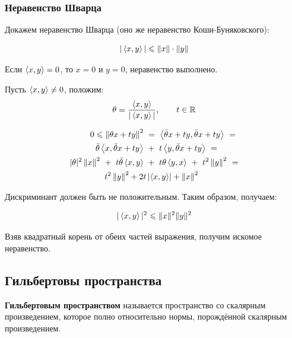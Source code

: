 \documentclass[12pt]{article}
\begin{document}


		\subsubsection{Неравенство Шварца}

			Докажем неравенство Шварца (оно же неравенство Коши-Буняковского):

			$$|\left\langle x, y \right\rangle| \leqslant \left\| x \right\| \cdot \left\| y \right\|$$


			Если $\left\langle x, y \right\rangle = 0$, то $x=0$ и $y=0$, неравенство выполнено.

			Пусть $\left\langle x, y \right\rangle \neq 0$, положим:
			$$\theta = \frac{\left\langle x, y \right\rangle}{|\left\langle x, y \right\rangle|},\qquad t \in \mathbb{R}$$

			\begin{align*}
				0 \leqslant \left\| 
				{\theta} x + t y \right\|^2 ~&=~ \left\langle \bar{\theta} x + t y, \bar{\theta} x + t y \right\rangle ~= \\
				\bar{\theta} \left\langle x, \bar{\theta} x + t y \right\rangle ~&+~ t \left\langle y, \bar{\theta} x + t y \right\rangle ~= \\
				|\theta|^2 \left\| x \right\|^2 ~+~ t \bar{\theta} \left\langle x, y \right\rangle ~&+~ t \theta \left\langle y, x \right\rangle ~+~ t^2 \left\| y \right\|^2 ~= \\
				t^2 \left\| y \right\|^2 + 2t &\left| \left\langle x, y \right\rangle \right| + \left\| x \right\|^2
			\end{align*}

			Дискриминант должен быть не положительным. Таким образом, получаем:

			$$|\left\langle x, y \right\rangle|^2 \leqslant \|x\|^2 \|y\|^2$$

			Взяв квадратный корень от обеих частей выражения, получим искомое неравенство.

	\subsection{Гильбертовы пространства}

		\begin{defi}
			\textbf{Гильбертовым пространством} называется пространство со скалярным произведением, которое полно относительно нормы, 
			порождённой  скалярным произведением.
		\end{defi}
	
\end{document}
